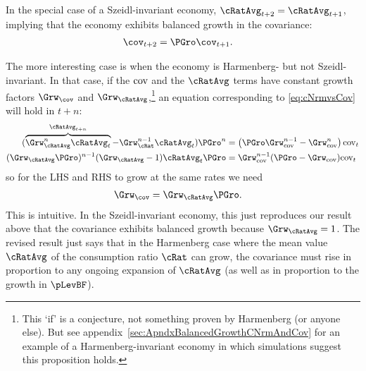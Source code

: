 \documentclass[BufferStockTheory]{subfiles}
\begin{document}
In the special case of a Szeidl-invariant economy, $\cRatAvg_{t+2} = \cRatAvg_{t+1}$, implying that the economy exhibits balanced growth in the covariance:
\begin{align}
  \cov_{t+2} & = \PGro \cov_{t+1}.
\end{align}

The more interesting case is when the economy is Harmenberg- but not Szeidl-invariant.  In that case, if the $\textup{cov}$ and the $\cRatAvg$ terms have constant growth factors $\Grw_{\cov}$ and $\Grw_{\cRatAvg}$,\footnote{This `if' is a conjecture, not something proven by Harmenberg (or anyone else).  But see appendix~\ref{sec:ApndxBalancedGrowthCNrmAndCov} for an example of a Harmenberg-invariant economy in which simulations suggest this proposition holds.} an equation corresponding to \eqref{eq:cNrmvsCov} will hold in $t+n$:
\begin{equation} \label{eq:aRatGrovsCovGronm1}
  \begin{split}
    (\overbrace{\Grw_{\cRatAvg}^{n}\cRatAvg_{t}}^{\cRatAvg_{t+n}}-\Grw^{n-1}_{\cRat}\cRatAvg_{t})\PGro^{n} & = \left(\PGro\Grw_{\cv}^{n-1} -\Grw_{\cv}^{n}\right)\cv_{t} 
    \\ (\Grw_{\cRatAvg}\PGro)^{n-1} (\Grw_{\cRatAvg}-1)\cRatAvg_{t}\PGro & = \Grw_{\cv}^{n-1}(\PGro - \Grw_{\cv}) \cv_{t}
  \end{split}
\end{equation}
so for the LHS and RHS to grow at the same rates we need
\begin{align}
  \Grw_{\cov}  & = \Grw_{\cRatAvg}\PGro \label{eq:aRatGrovscovGro}. 
\end{align}
This is intuitive.  In the Szeidl-invariant economy, this just reproduces our result above that the covariance exhibits balanced growth because $\Grw_{\cRatAvg}=1$.  The revised result just says that in the Harmenberg case where the mean value $\cRatAvg$ of the consumption ratio $\cRat$ can grow, the covariance must rise in proportion to any ongoing expansion of $\cRatAvg$ (as well as in proportion to the growth in $\pLevBF$).
\end{document}
